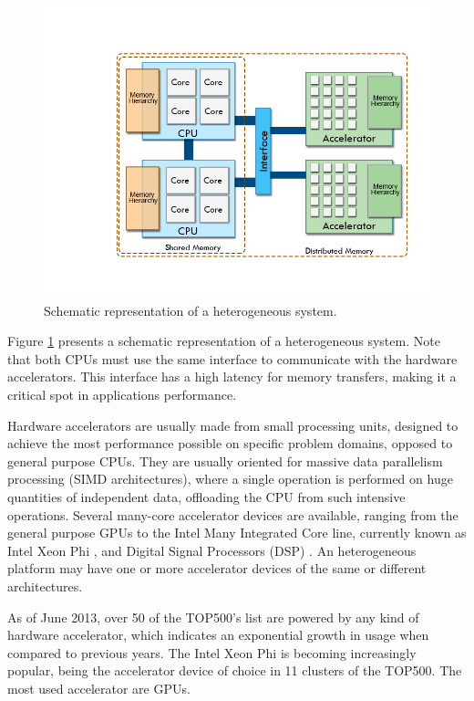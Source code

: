\begin{figure}[!htp]
	\begin{center}
		\includegraphics[scale=0.4]{../../common/img/hetplats2.png}
		\caption{Schematic representation of a heterogeneous system.}
		\label{fig:HeterogeneousSystem}
	\end{center}
\end{figure}

Figure \ref{fig:HeterogeneousSystem} presents a schematic representation of a heterogeneous system. Note that both CPUs must use the same interface to communicate with the hardware accelerators. This interface has a high latency for memory transfers, making it a critical spot in applications performance.

Hardware accelerators are usually made from small processing units, designed to achieve the most performance possible on specific problem domains, opposed to general purpose CPUs. They are usually oriented for massive data parallelism processing (SIMD architectures), where a single operation is performed on huge quantities of independent data, offloading the CPU from such intensive operations. Several many-core accelerator devices are available, ranging from the general purpose GPUs to the Intel Many Integrated Core line, currently known as Intel Xeon Phi \cite{Intel:MIC}, and Digital Signal Processors (DSP) \cite{Texas:DSP}. An heterogeneous platform may have one or more accelerator devices of the same or different architectures.

As of June 2013, over 50 of the TOP500’s list \cite{TOP500} are powered by any kind of hardware accelerator, which indicates an exponential growth in usage when compared to previous years. The Intel Xeon Phi is becoming increasingly popular, being the accelerator device of choice in 11 clusters of the TOP500. The most used accelerator are \nvidia GPUs.

